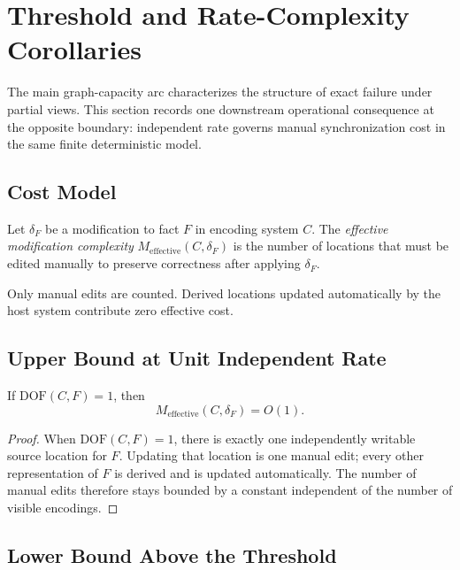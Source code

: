 \section{Threshold and Rate-Complexity Corollaries}\label{sec:rate-corollaries}


The main graph-capacity arc characterizes the structure of exact failure under partial views. This section records one downstream operational consequence at the opposite boundary: independent rate governs manual synchronization cost in the same finite deterministic model.

\subsection{Cost Model}\label{sec:cost-model}

\begin{definition}\label{def:cost-model}
Let $\delta_F$ be a modification to fact $F$ in encoding system $C$. The \emph{effective modification complexity} $M_{\mathrm{effective}}(C,\delta_F)$ is the number of locations that must be edited manually to preserve correctness after applying $\delta_F$.
\end{definition}

Only manual edits are counted. Derived locations updated automatically by the host system contribute zero effective cost.

\subsection{Upper Bound at Unit Independent Rate}\label{sec:upper-bound}

\begin{theorem}\label{thm:upper-bound}
If $\text{DOF}(C,F)=1$, then
\[
M_{\mathrm{effective}}(C,\delta_F)=O(1).
\]
\end{theorem}

\begin{proof}
When $\text{DOF}(C,F)=1$, there is exactly one independently writable source location for $F$. Updating that location is one manual edit; every other representation of $F$ is derived and is updated automatically. The number of manual edits therefore stays bounded by a constant independent of the number of visible encodings.
\end{proof}

\subsection{Lower Bound Above the Threshold}\label{sec:lower-bound}

